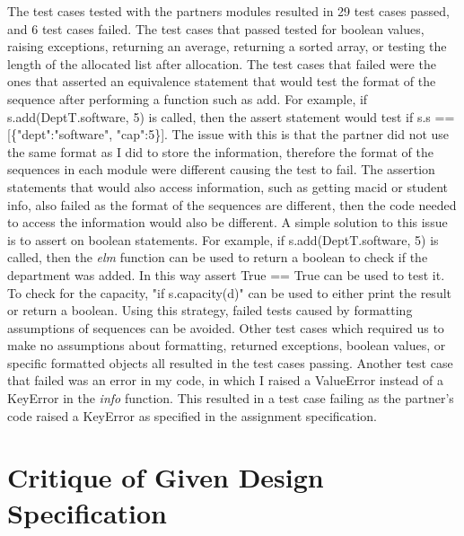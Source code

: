 \documentclass[12pt]{article}
\begin{document}
The test cases tested with the partners modules resulted in 29 test cases passed, and 6 test cases failed. The test cases that passed tested for boolean values, raising exceptions, 
returning an average, returning a sorted array, or testing the length of the allocated list after allocation. The test cases that failed were the ones that asserted an equivalence statement
that would test the format of the sequence after performing a function such as add. For example, if s.add(DeptT.software, 5) is called, then the assert statement would test if s.s == [\{"dept":"software", "cap":5\}].
The issue with this is that the partner did not use the same format as I did to store the information, therefore the format of the sequences in each module were different causing the test to fail. The assertion statements that would
also access information, such as getting macid or student info, also failed as the format of the sequences are different, then the code needed to access the information would also 
be different. A simple solution to this issue is to assert on boolean statements. For example, if s.add(DeptT.software, 5) is called, then the \textit{elm} function can be used to return a boolean to check if the department was added.
In this way assert True == True can be used to test it. To check for the capacity, "if s.capacity(d)" can be used to either print the result or return a boolean. Using this strategy, failed tests caused by 
formatting assumptions of sequences can be avoided. Other test cases which required us to make no assumptions about formatting, returned exceptions, boolean values, or specific formatted objects all resulted in the test cases passing. 
Another test case that failed was an error in my code, in which I raised a ValueError instead of a KeyError in the \textit{info} function. This resulted in a test case failing as the partner's code raised a KeyError as specified in the assignment specification.


\section{Critique of Given Design Specification}
\end{document}
